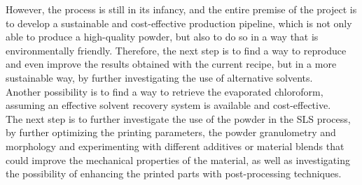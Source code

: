 \documentclass{article}
\begin{document}
    However, the process is still in its infancy, and the entire premise of the project is to develop a sustainable 
    and cost-effective production pipeline, which is not only able to produce a high-quality powder, but also 
    to do so in a way that is environmentally friendly. Therefore, the next step is to find a way to reproduce and 
    even improve the results obtained with the current recipe, but in a more sustainable way, by further 
    investigating the use of alternative solvents. \\ 

    Another possibility is to find a way to retrieve the evaporated chloroform, assuming an effective solvent recovery 
    system is available and cost-effective. \\ 

    The next step is to further investigate the use of the powder in the SLS process, by further optimizing the 
    printing parameters, the powder granulometry and morphology and experimenting with different additives or material blends that 
    could improve the mechanical properties of the material, as well as investigating the possibility of enhancing the printed parts 
    with post-processing techniques. \\ 


    \clearpage

    \printbibliography
\end{document}
